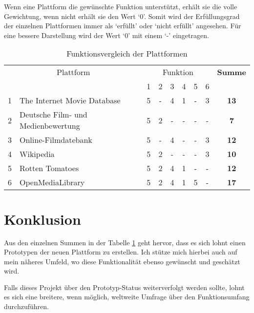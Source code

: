 Wenn eine Plattform die gewünschte Funktion unterstützt, erhält sie die volle Gewichtung,
wenn nicht erhält sie den Wert `0'. Somit wird der Erfüllungsgrad der einzelnen Plattformen
immer als `erfüllt' oder `nicht erfüllt' angesehen. Für eine bessere Darstellung wird der Wert `0'
mit einem `-' eingetragen. 

\begin{table}[h]
\begin{center}
    \begin{tabular}{llccccccc}
        \toprule
        \multicolumn{2}{c}{Plattform} & \multicolumn{6}{c}{Funktion} & \textbf{Summe} \\
        \multicolumn{2}{c}{} & 1 & 2 & 3 & 4 & 5 & 6 & \\ 
        \midrule 1 & The Internet Movie Database & 5 & - & 4 & 1 & - & 3 & \textbf{13} \\
        \midrule 2 & Deutsche Film- und Medienbewertung & 5 & 2 & - & - & - & - & \textbf{7} \\ 
        \midrule 3 & Online-Filmdatebank & 5 & - & 4 & - & - & 3 & \textbf{12} \\ 
        \midrule 4 & Wikipedia & 5 & 2 & - & - & - & 3 & \textbf{10} \\ 
        \midrule 5 & Rotten Tomatoes & 5 & 2 & 4 & 1 & - & - & \textbf{12} \\ 
        \midrule 6 & OpenMediaLibrary & 5 & 2 & 4 & 1 & 5 & - & \textbf{17} \\ 
        \bottomrule
    \end{tabular}
    \caption{Funktionsvergleich der Plattformen}
    \label{tab:funktionen_vergleich}
\end{center}
\end{table}

\section{Konklusion}
Aus den einzelnen Summen in der Tabelle \ref{tab:funktionen_vergleich} geht hervor,
dass es sich lohnt einen Prototypen der neuen Plattform zu erstellen. Ich stütze
mich hierbei auch auf mein näheres Umfeld, wo diese Funktionalität ebenso gewünscht 
und geschätzt wird.

Falls dieses Projekt über den Prototyp-Status weiterverfolgt werden sollte, lohnt
es sich eine breitere, wenn möglich, weltweite Umfrage über den Funktionsumfang
durchzuführen.